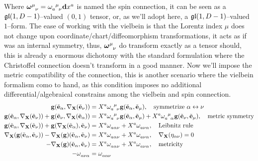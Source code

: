 Where $\tensor{{\boldsymbol\omega}}{^\mu_\nu}=\tensor{\omega}{_a^\mu_\nu}\vb dx^a$ is named the spin connection, it can be seen as a $\mathfrak{gl}\qty(1,D-1)$--valued $(0,1)$ tensor, 
or, as we'll adopt here, a $\mathfrak{gl}\qty(1,D-1)$--valued $1$--form.
The ease of working with the vielbein is that the Lorentz index $\mu$ 
does not change upon coordinate/chart/diffeomorphism transformations, it acts as if was an internal symmetry, thus, 
$\tensor{{\boldsymbol\omega}}{^\mu_\nu}$ do transform exactly as a tensor should, this is already a enormous dichotomy 
with the standard formulation where the Christoffel connection doesn't transform in a good manner.
Now we'll impose the metric compatibility of the connection, 
this is another scenario where the vielbein formalism como to hand, as this condition imposes no additional differential/algebraical constrains among the vielbein and spin connection.
\begin{align*}
    \vb g\qty(\tilde{\vb e}_\alpha,\nabla_{\vb X}\qty(\tilde{\vb e}_\nu))&=X^a\tensor{\omega}{_a^\mu_\nu}\vb g\qty(\tilde{\vb e}_\alpha,\tilde{\vb e}_\mu),\ \ \ \textnormal{symmetrize }\alpha\leftrightarrow\nu\\
    \vb g\qty(\tilde{\vb e}_\alpha,\nabla_{\vb X}\qty(\tilde{\vb e}_\nu))+\vb g\qty(\tilde{\vb e}_\nu,\nabla_{\vb X}\qty(\tilde{\vb e}_\alpha))&=X^a\tensor{\omega}{_a^\mu_\nu}\vb g\qty(\tilde{\vb e}_\alpha,\tilde{\vb e}_\mu)+X^a\tensor{\omega}{_a^\mu_\alpha}\vb g\qty(\tilde{\vb e}_\nu,\tilde{\vb e}_\mu),\ \ \ \textnormal{metric symmetry}\\
    \vb g\qty(\tilde{\vb e}_\alpha,\nabla_{\vb X}\qty(\tilde{\vb e}_\nu))+\vb g\qty(\nabla_{\vb X}\qty(\tilde{\vb e}_\alpha),\tilde{\vb e}_\nu)&=X^a\tensor{\omega}{_a_\alpha_\nu}+X^a\tensor{\omega}{_a_\nu_\alpha},\ \ \ \textnormal{Leibnitz rule}\\
    \nabla_{\vb X}\qty(\vb g\qty(\tilde{\vb e}_\alpha,\tilde{\vb e}_\nu))-\nabla_{\vb X}\qty(\vb g)\qty(\tilde{\vb e}_\alpha,\tilde{\vb e}_\nu)&=X^a\tensor{\omega}{_a_\alpha_\nu}+X^a\tensor{\omega}{_a_\nu_\alpha},\ \ \ \nabla_{\vb X}\qty(\eta_{\alpha\nu})=0\\
    -\nabla_{\vb X}\qty(\vb g)\qty(\tilde{\vb e}_\alpha,\tilde{\vb e}_\nu)&=X^a\tensor{\omega}{_a_\alpha_\nu}+X^a\tensor{\omega}{_a_\nu_\alpha},\ \ \ \textnormal{metricity}\\
    -\tensor{\omega}{_a_\nu_\alpha}&=\tensor{\omega}{_a_\alpha_\nu}
\end{align*}

